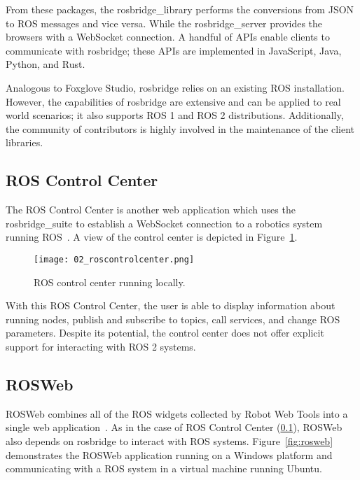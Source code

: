         From these packages, the \textsf{rosbridge\_library} performs the conversions from \ac{JSON} to \ac{ROS} messages and vice versa. While the \textsf{rosbridge\_server} provides the browsers with a WebSocket connection. A handful of \ac{API}s enable clients to communicate with \textsf{rosbridge}; these \ac{API}s are implemented in JavaScript, Java, Python, and Rust.

        Analogous to Foxglove Studio, \textsf{rosbridge} relies on an existing ROS installation. However, the capabilities of \textsf{rosbridge} are extensive and can be applied to real world scenarios; it also supports \ac{ROS} 1 and \ac{ROS} 2 distributions. Additionally, the community of contributors is highly involved in the maintenance of the client libraries.

    \subsection{ROS Control Center}\label{sec:roscontrolcenter}

        The \ac{ROS} Control Center is another web application which uses the \textsf{rosbridge\_suite} to establish a WebSocket connection to a robotics system running \ac{ROS}~\cite{controlcenter}. A view of the control center is depicted in Figure~\ref{fig:roscontrolcenter}.

        \begin{figure}[htbp]
            \centering
            \texttt{[image: 02\_roscontrolcenter.png]}
            \caption{ROS control center running locally.}
            \label{fig:roscontrolcenter}
        \end{figure}

        With this \ac{ROS} Control Center, the user is able to display information about running nodes, publish and subscribe to topics, call services, and change \ac{ROS} parameters. Despite its potential, the control center does not offer explicit support for interacting with \ac{ROS} 2 systems.

    \subsection{ROSWeb}

        ROSWeb combines all of the \ac{ROS} widgets collected by Robot Web Tools into a single web application~\cite{rosweb}. As in the case of ROS Control Center (\ref{sec:roscontrolcenter}), ROSWeb also depends on \textsf{rosbridge} to interact with \ac{ROS} systems. Figure~\ref{fig:rosweb} demonstrates the ROSWeb application running on a Windows platform and communicating with a \ac{ROS} system in a virtual machine running Ubuntu.


